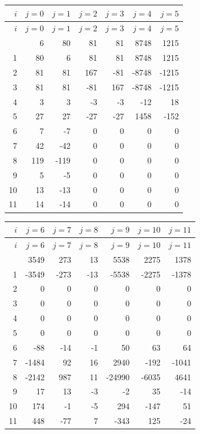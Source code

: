 \begingroup\footnotesize
\setlength{\tabcolsep}{5pt}
\begin{longtable}{@{}rrrrrrr@{}}
\toprule
$i$  & $j=0$ & $j=1$ & $j=2$ & $j=3$ & $j=4$ & $j=5$\\
\midrule\endfirsthead
\toprule
$i$  & $j=0$ & $j=1$ & $j=2$ & $j=3$ & $j=4$ & $j=5$\\
\midrule\endhead
\bottomrule\endfoot
0 & 6 & 80 & 81 & 81 & 8748 & 1215\\
1 & 80 & 6 & 81 & 81 & 8748 & 1215\\
2 & 81 & 81 & 167 & -81 & -8748 & -1215\\
3 & 81 & 81 & -81 & 167 & -8748 & -1215\\
4 & 3 & 3 & -3 & -3 & -12 & 18\\
5 & 27 & 27 & -27 & -27 & 1458 & -152\\
6 & 7 & -7 & 0 & 0 & 0 & 0\\
7 & 42 & -42 & 0 & 0 & 0 & 0\\
8 & 119 & -119 & 0 & 0 & 0 & 0\\
9 & 5 & -5 & 0 & 0 & 0 & 0\\
10 & 13 & -13 & 0 & 0 & 0 & 0\\
11 & 14 & -14 & 0 & 0 & 0 & 0\\
\end{longtable}
\endgroup

\begingroup\footnotesize
\setlength{\tabcolsep}{5pt}
\begin{longtable}{@{}rrrrrrr@{}}
\toprule
$i$  & $j=6$ & $j=7$ & $j=8$ & $j=9$ & $j=10$ & $j=11$\\
\midrule\endfirsthead
\toprule
$i$  & $j=6$ & $j=7$ & $j=8$ & $j=9$ & $j=10$ & $j=11$\\
\midrule\endhead
\bottomrule\endfoot
0 & 3549 & 273 & 13 & 5538 & 2275 & 1378\\
1 & -3549 & -273 & -13 & -5538 & -2275 & -1378\\
2 & 0 & 0 & 0 & 0 & 0 & 0\\
3 & 0 & 0 & 0 & 0 & 0 & 0\\
4 & 0 & 0 & 0 & 0 & 0 & 0\\
5 & 0 & 0 & 0 & 0 & 0 & 0\\
6 & -88 & -14 & -1 & 50 & 63 & 64\\
7 & -1484 & 92 & 16 & 2940 & -192 & -1041\\
8 & -2142 & 987 & 11 & -24990 & -6035 & 4641\\
9 & 17 & 13 & -3 & -2 & 35 & -14\\
10 & 174 & -1 & -5 & 294 & -147 & 51\\
11 & 448 & -77 & 7 & -343 & 125 & -24\\
\end{longtable}
\endgroup
